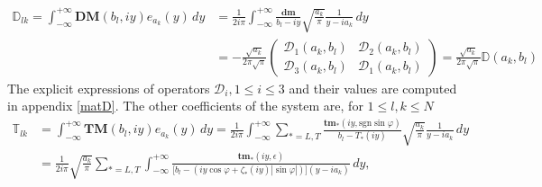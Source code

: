 \begin{equation}
\begin{split}
\mathbb{D}_{lk}=\int_{-\infty}^{+\infty} \textbf{DM}(b_l,iy)e_{a_k}(y) \, dy &=\frac{1}{2i\pi} \int_{-\infty}^{+\infty} \frac{\mathbf{dm}}{b_l-iy} 
\sqrt{\frac{a_k}{\pi}}\frac{1}{y-ia_k} \, dy \\
&=- \frac{\sqrt{a_k}}{2\pi \sqrt{\pi}}
\begin{pmatrix}
\mathcal{D}_1(a_k,b_l) & \mathcal{D}_2(a_k,b_l) \\
\mathcal{D}_3(a_k,b_l) &\mathcal{D}_1(a_k,b_l)
\end{pmatrix}=\frac{\sqrt{a_k}}{2\pi \sqrt{\pi}}\mathbb{D}(a_k,b_l)
\end{split}
\label{C3:Dab}
\end{equation}
The explicit expressions of operators $\mathcal{D}_i, 1\leq i\leq3$ and their values are computed in appendix \ref{matD}.
The other coefficients of the system are, for $1\leq l,k \leq N$
\begin{equation}
\begin{split}
\mathbb{T}_{lk}&=\int_{-\infty}^{+\infty} \textbf{TM}(b_l,iy)e_{a_k}(y) \, dy 
=\frac{1}{2i\pi} \int_{-\infty}^{+\infty} \sum_{*=L,T} \frac{\textbf{tm}_* (iy, \mbox{sgn} \sin \varphi)}{b_l-T_*(iy)} \sqrt{\frac{a_k}{\pi}}\frac{1}{y-ia_k}\,dy \\
&=\frac{1}{2i\pi}\sqrt{\frac{a_k}{\pi}}\sum_{*=L,T} \int_{-\infty}^{+\infty} \frac{\textbf{tm}_*(iy,\epsilon)}{\lbrack b_l-(iy \cos \varphi +  \zeta_*(iy)| \sin \varphi|)\rbrack(y-ia_k)} \, dy,
\end{split}
\end{equation}
